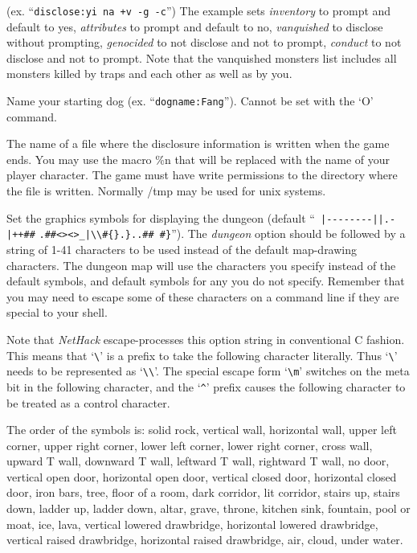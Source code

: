(ex. ``{\tt disclose:yi na +v -g -c}'')
The example sets 
{\it inventory }
to prompt and default to yes,
{\it attributes }
to prompt and default to no,
{\it vanquished }
to disclose without prompting,
{\it genocided }
to not disclose and not to prompt,
{\it conduct }
to not disclose and not to prompt.
Note that the vanquished monsters list includes all monsters killed by
traps and each other as well as by you.
\item[\tb{dogname}]
Name your starting dog (ex. ``{\tt dogname:Fang}'').
Cannot be set with the `O' command.
\item[\tb{dumpfile}]
The name of a file where the disclosure information is written when the
game ends. You may use the macro \%n that will be replaced with the name
of your player character. The game must have write permissions to the
directory where the file is written. Normally /tmp may be used for unix
systems.
\item[\tb{dungeon}]
Set the graphics symbols for displaying the dungeon
(default
``\verb& |--------||.-|++##& \verb&.##<><>_|\\#{}.}..## #}&'').
The
{\it dungeon }
option should be followed by a string of 1-41
characters to be used instead of the default map-drawing characters.
The dungeon map will use the characters you specify instead of the
default symbols, and default symbols for any you do not specify.
Remember that you may need to escape some of these characters
on a command line if they are special to your shell.

Note that {\it NetHack\/} escape-processes this option string in conventional C
fashion.  This means that `\verb+\+' is a prefix to take the following
character literally.  Thus `\verb+\+' needs to be represented as `\verb+\\+'.
The special escape form
`\verb+\m+' switches on the meta bit in the following character, and the
`{\tt \^{}}' prefix causes the following character to be treated as a control
character.

The order of the symbols is:  solid rock, vertical wall, horizontal
wall, upper left corner, upper right corner, lower left corner, lower
right corner, cross wall, upward T wall, downward T wall, leftward T
wall, rightward T wall, no door, vertical open door, horizontal open
door, vertical closed door, horizontal closed door, iron bars, tree,
floor of a room, dark corridor, lit corridor, stairs up, stairs down,
ladder up, ladder down, altar, grave, throne, kitchen sink, fountain, pool or moat,
ice, lava, vertical lowered drawbridge, horizontal lowered drawbridge,
vertical raised drawbridge, horizontal raised drawbridge, air, cloud,
under water.

